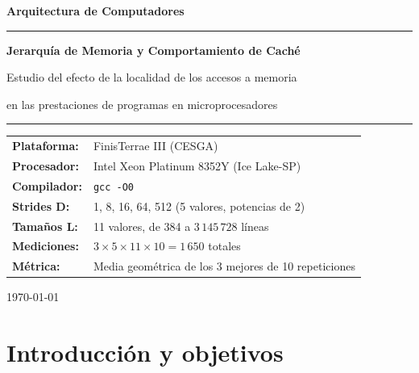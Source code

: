 \documentclass[12pt,a4paper]{article}
\begin{document}
\begin{titlepage}
  \centering\vspace*{2cm}
  {\LARGE\bfseries\color{azul} Arquitectura de Computadores\par}
  \vspace{0.4cm}{\large Práctica 1\par}\vspace{1.2cm}
  \rule{0.8\textwidth}{1pt}\vspace{0.5cm}

  {\LARGE\bfseries Jerarquía de Memoria y Comportamiento de Caché\par}
  \vspace{0.3cm}
  {\large Estudio del efecto de la localidad de los accesos a memoria\par
   en las prestaciones de programas en microprocesadores\par}
  \vspace{0.5cm}\rule{0.8\textwidth}{1pt}\vspace{2cm}

  \begin{tabular}{ll}
    \textbf{Plataforma:} & FinisTerrae III (CESGA) \\[4pt]
    \textbf{Procesador:} & Intel Xeon Platinum 8352Y (Ice Lake-SP) \\[4pt]
    \textbf{Compilador:} & \texttt{gcc -O0} \\[4pt]
    \textbf{Strides D:}   & 1, 8, 16, 64, 512 (5 valores, potencias de 2) \\[4pt]
    \textbf{Tamaños L:}   & 11 valores, de 384 a $3\,145\,728$ líneas \\[4pt]
    \textbf{Mediciones:}  & $3 \times 5 \times 11 \times 10 = 1\,650$ totales \\[4pt]
    \textbf{Métrica:}     & Media geométrica de los 3 mejores de 10 repeticiones \\
  \end{tabular}
  \vfill{\large\today\par}
\end{titlepage}

\tableofcontents\clearpage

\section{Introducción y objetivos}
\end{document}
